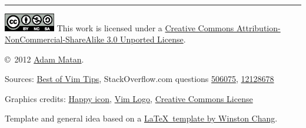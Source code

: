 \documentclass[10pt,landscape]{article}
\begin{document}
\begin{multicols}{3}
\begin{center}
\rule{0.3\linewidth}{0.25pt}
\end{center}






\includegraphics[width=6em]{by_nc_sa.eps} This work is licensed under a \href{http://creativecommons.org/licenses/by-nc-sa/3.0/}{Creative Commons Attribution-NonCommercial-ShareAlike 3.0 Unported License}.

{\copyright\ 2012 \href{http://matan.name}{Adam Matan}.}

\begin{tiny}
Sources: \href{http://rayninfo.co.uk/vimtips.html}{Best of Vim Tips},
StackOverflow.com questions \href{http://stackoverflow.com/questions/506075/how-do-i-fix-the-indentation-of-an-entire-file-in-vi}	{506075},
							\href{http://stackoverflow.com/questions/12128678/vim-go-to-beginning-end-of-next-method}				{12128678}

Graphics credits: 	\href{http://commons.wikimedia.org/wiki/File:Gnome-face-smile.svg}	{Happy icon},
					\href{http://en.wikipedia.org/wiki/File:Vimlogo.svg}				{Vim Logo},
					\href{http://creativecommons.org/about/downloads}					{Creative Commons License}



Template and general idea based on a \href{http://www.stdout.org/~winston/latex/}{\LaTeX\ template by Winston Chang}.
\end{tiny}




\end{multicols}
\end{document}

